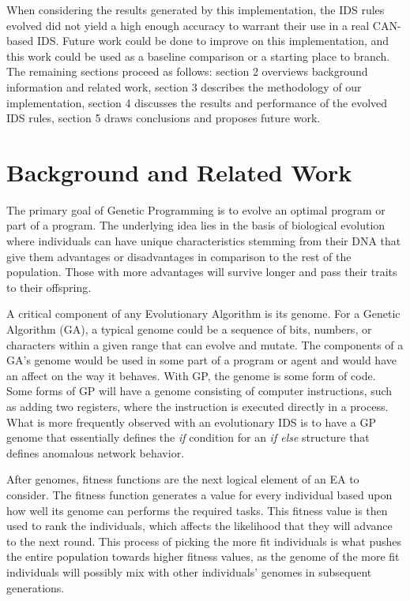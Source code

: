 \documentclass[10pt,conference]{IEEEtran}
\begin{document}
When considering the results generated by this implementation, the IDS rules evolved did not yield a high enough accuracy to warrant their use in a real CAN-based IDS.  Future work could be done to improve on this implementation, and this work could be used as a baseline comparison or a starting place to branch.  The remaining sections proceed as follows: section 2 overviews background information and related work, section 3 describes the methodology of our implementation, section 4 discusses the results and performance of the evolved IDS rules, section 5 draws conclusions and proposes future work.

\section{Background and Related Work}

The primary goal of Genetic Programming is to evolve an optimal program or part of a program. The underlying idea lies in the basis of biological evolution where individuals can have unique characteristics stemming from their DNA that give them advantages or disadvantages in comparison to the rest of the population.  Those with more advantages will survive longer and pass their traits to their offspring.  

A critical component of any Evolutionary Algorithm is its genome.  For a Genetic Algorithm (GA), a typical genome could be a sequence of bits, numbers, or characters within a given range that can evolve and mutate.  The components of a GA's genome would be used in some part of a program or agent and would have an affect on the way it behaves.  With GP, the genome is some form of code.  Some forms of GP will have a genome consisting of computer instructions, such as adding two registers, where the instruction is executed directly in a process.  What is more frequently observed with an evolutionary IDS is to have a GP genome that essentially defines the \textit{if} condition for an \textit{if else} structure that defines anomalous network behavior.  

After genomes, fitness functions are the next logical element of an EA to consider.  The fitness function generates a value for every individual based upon how well its genome can performs the required tasks.  This fitness value is then used to rank the individuals, which affects the likelihood that they will advance to the next round.  This process of picking the more fit individuals is what pushes the entire population towards higher fitness values, as the genome of the more fit individuals will possibly mix with other individuals' genomes in subsequent generations.  
\end{document}
